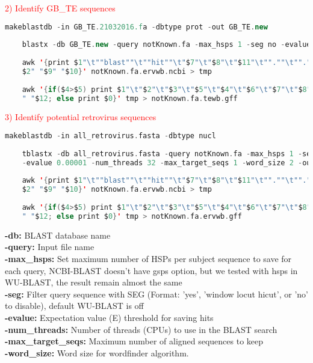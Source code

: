 \documentclass[a4paper,12pt]{article}
\begin{document}
	\noindent \textcolor{red}{2) Identify GB\_TE sequences}
	\begin{lstlisting}[language=scala]
	makeblastdb -in GB_TE.21032016.fa -dbtype prot -out GB_TE.new
	
	blastx -db GB_TE.new -query notKnown.fa -max_hsps 1 -seg no -evalue 0.00001 -num_threads 32 -max_target_seqs 1 -word_size 2 -outfmt 6 -out notKnown.fa.tewb.ncbi
	
	awk '{print $1"\t""blast""\t""hit""\t"$7"\t"$8"\t"$11"\t"".""\t"".""\t""Target sp|"
	$2" "$9" "$10}' notKnown.fa.ervwb.ncbi > tmp
	
	awk '{if($4>$5) print $1"\t"$2"\t"$3"\t"$5"\t"$4"\t"$6"\t"$7"\t"$8"\t"$9" "$10" "$11
	" "$12; else print $0}' tmp > notKnown.fa.tewb.gff \end{lstlisting}
	
	\noindent \textcolor{red}{3) Identify potential retrovirus sequences}
	\begin{lstlisting}[language=scala]
	makeblastdb -in all_retrovirus.fasta -dbtype nucl 
	
	tblastx -db all_retrovirus.fasta -query notKnown.fa -max_hsps 1 -seg no \
	-evalue 0.00001 -num_threads 32 -max_target_seqs 1 -word_size 2 -outfmt 6 -out notKnown.fa.ervwb.ncbi
	
	awk '{print $1"\t""blast""\t""hit""\t"$7"\t"$8"\t"$11"\t"".""\t"".""\t""Target sp|"
	$2" "$9" "$10}' notKnown.fa.ervwb.ncbi > tmp
	
	awk '{if($4>$5) print $1"\t"$2"\t"$3"\t"$5"\t"$4"\t"$6"\t"$7"\t"$8"\t"$9" "$10" "$11
	" "$12; else print $0}' tmp > notKnown.fa.ervwb.gff \end{lstlisting}
	
	\noindent \textbf{-db:} BLAST database name \\
	\textbf{-query:} Input file name \\
	\textbf{-max\_hsps:} Set maximum number of HSPs per subject sequence to save for each query, NCBI-BLAST doesn't have gsps option, but we tested with hsps in WU-BLAST, the result remain almost the same \\
	\textbf{-seg:} Filter query sequence with SEG (Format: 'yes', 'window locut hicut', or 'no' to disable), default WU-BLAST is off \\
	\textbf{-evalue:} Expectation value (E) threshold for saving hits \\
	\textbf{-num\_threads:} Number of threads (CPUs) to use in the BLAST search \\
	\textbf{-max\_target\_seqs:} Maximum number of aligned sequences to keep \\
	\textbf{-word\_size:} Word size for wordfinder algorithm.
	
\end{document}
